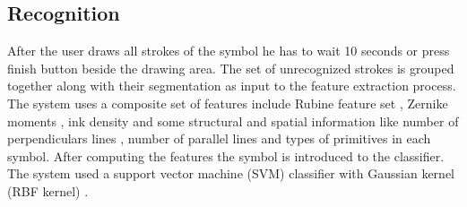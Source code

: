\documentclass[a4paper,10pt]{IEEEconf}
\begin{document}
\subsection{Recognition}
After the user draws all strokes of the symbol he has to wait 10 seconds or press finish button beside the drawing area. The set of unrecognized strokes is grouped together along with their segmentation as input to the feature extraction process. The system uses a composite set of features include Rubine feature set \cite{gestureexample12}, Zernike moments \cite{HeloiseBeautification}, ink density \cite{GeometryAndDomain102} and some structural and spatial information like number of perpendiculars lines , number of parallel lines and types of primitives in each symbol. After computing the features the symbol is introduced to the classifier. The system used a support vector machine (SVM) classifier with Gaussian kernel (RBF kernel) \cite{libsvm}.\\%
%
\end{document}
